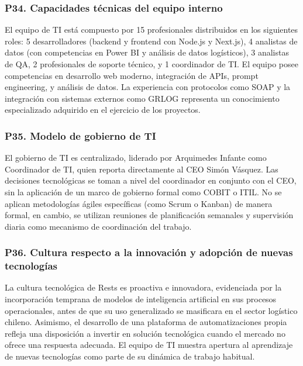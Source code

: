 \documentclass[12pt]{article}
\begin{document}
\subsubsection*{\textbf{P34. Capacidades t\'ecnicas del equipo interno}}

El equipo de TI est\'a compuesto por 15 profesionales distribuidos en los siguientes
roles: 5 desarrolladores (backend y frontend con Node.js y Next.js), 4 analistas de datos
(con competencias en Power BI y an\'alisis de datos log\'isticos), 3 analistas de QA,
2 profesionales de soporte t\'ecnico, y 1 coordinador de TI. El equipo posee competencias
en desarrollo web moderno, integraci\'on de APIs, prompt engineering, y an\'alisis de datos.
La experiencia con protocolos como SOAP y la integraci\'on con sistemas externos como GRLOG
representa un conocimiento especializado adquirido en el ejercicio de los proyectos.

\subsubsection*{\textbf{P35. Modelo de gobierno de TI}}

El gobierno de TI es centralizado, liderado por Arquimedes Infante como Coordinador
de TI, quien reporta directamente al CEO Sim\'on V\'asquez. Las decisiones tecnol\'ogicas se
toman a nivel del coordinador en conjunto con el CEO, sin la aplicaci\'on de un marco de
gobierno formal como COBIT o ITIL. No se aplican metodolog\'ias \'agiles espec\'ificas
(como Scrum o Kanban) de manera formal, en cambio, se utilizan reuniones de planificaci\'on
semanales y supervisi\'on diaria como mecanismo de coordinaci\'on del trabajo.

\subsubsection*{\textbf{P36. Cultura respecto a la innovaci\'on y adopci\'on de nuevas tecnolog\'ias}}

La cultura tecnol\'ogica de Rests es proactiva e innovadora, evidenciada por la
incorporaci\'on temprana de modelos de inteligencia artificial en
sus procesos operacionales, antes de que su uso generalizado se masificara en el sector
log\'istico chileno. Asimismo, el desarrollo de una plataforma de automatizaciones propia
refleja una disposici\'on a invertir en soluci\'on tecnol\'ogica cuando el mercado no
ofrece una respuesta adecuada. El equipo de TI muestra apertura al aprendizaje de nuevas
tecnolog\'ias como parte de su din\'amica de trabajo habitual.
\end{document}
